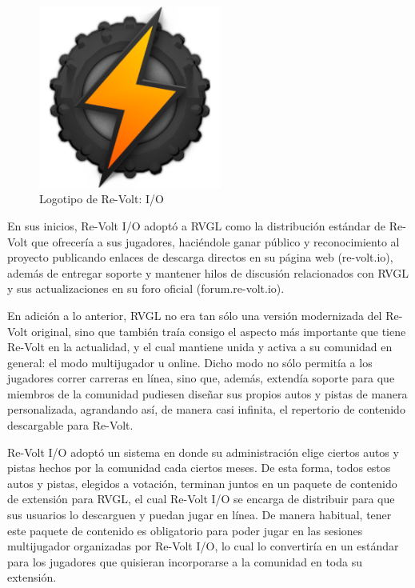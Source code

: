 \begin{figure}[H]
  \begin{center}
    \includegraphics[width=6cm, height=6cm]{img/io.png}
  \end{center}
  \caption[Logotipo de Re-Volt: I/O]{Logotipo de Re-Volt: I/O}
  \label{fig:io}
\end{figure}

En sus inicios, Re-Volt I/O adoptó a RVGL como la distribución estándar de Re-Volt que ofrecería a sus jugadores, haciéndole ganar público y reconocimiento al proyecto publicando enlaces de descarga directos en su página web (re-volt.io), además de entregar soporte y mantener hilos de discusión relacionados con RVGL y sus actualizaciones en su foro oficial (forum.re-volt.io).

En adición a lo anterior, RVGL no era tan sólo una versión modernizada del Re-Volt original, sino que también traía consigo el aspecto más importante que tiene Re-Volt en la actualidad, y el cual mantiene unida y activa a su comunidad en general: el modo multijugador u online. Dicho modo no sólo permitía a los jugadores correr carreras en línea, sino que, además, extendía soporte para que miembros de la comunidad pudiesen diseñar sus propios autos y pistas de manera personalizada, agrandando así, de manera casi infinita, el repertorio de contenido descargable para Re-Volt.

Re-Volt I/O adoptó un sistema en donde su administración elige ciertos autos y pistas hechos por la comunidad cada ciertos meses. De esta forma, todos estos autos y pistas, elegidos a votación, terminan juntos en un paquete de contenido de extensión para RVGL, el cual Re-Volt I/O se encarga de distribuir para que sus usuarios lo descarguen y puedan jugar en línea. De manera habitual, tener este paquete de contenido es obligatorio para poder jugar en las sesiones multijugador organizadas por Re-Volt I/O, lo cual lo convertiría en un estándar para los jugadores que quisieran incorporarse a la comunidad en toda su extensión.

